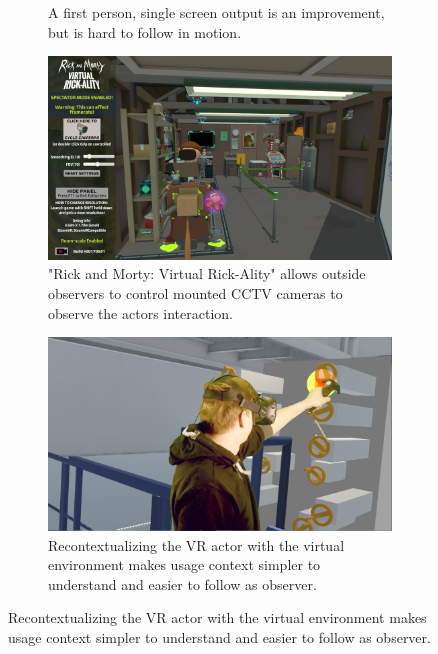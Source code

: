 \begin{figure}[htbp]
\begin{subfigure}[t]{.45\textwidth}
		\caption{A first person, single screen output is an improvement, but is 
			hard to follow in motion.}
	\end{subfigure}
	\newline
	\begin{subfigure}[t]{.45\textwidth}
		\centering
		\includegraphics[width=\textwidth]{gfx/prod-ex/cctv.jpg}
		\caption{"Rick and Morty: Virtual Rick-Ality" allows outside observers 
			to control mounted CCTV cameras to observe the actors interaction.}
	\end{subfigure}
	\begin{subfigure}[t]{.45\textwidth}
		\centering
		\includegraphics[width=\textwidth]{gfx/mr-action.png}
		\caption{Recontextualizing the VR actor with the virtual environment 
		makes usage context simpler to understand and easier to follow as 
		observer.}
	\end{subfigure}
\end{figure}

